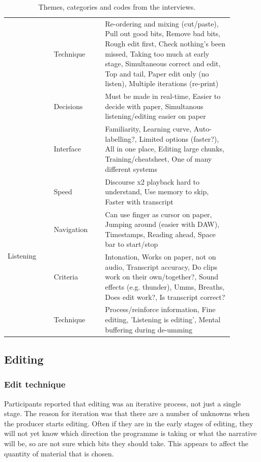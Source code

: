 \begin{table}[h]
{\begin{tabular}{|p{0.18\linewidth}|p{0.2\linewidth}|p{0.5\linewidth}|}
 & Technique & Re-ordering and mixing (cut/paste), Pull out good bits, Remove bad bits, Rough edit first, Check nothing's been missed, Taking too much at early stage, Simultaneous correct and edit, Top and tail, Paper edit only (no listen), Multiple iterations (re-print) \\ \cline{2-3}
 & Decisions & Must be made in real-time, Easier to decide with paper, Simultanous listening/editing easier on paper \\ \cline{2-3}
 & Interface & Familiarity, Learning curve, Auto-labelling?, Limited options (faster?), All in one place, Editing large chunks, Training/cheatsheet, One of many different systems \\ \hline
\multirow{4}{*}{Listening}
 & Speed & Discourse x2 playback hard to understand, Use memory to skip, Faster with transcript \\ \cline{2-3}
 & Navigation & Can use finger as cursor on paper, Jumping around (easier with DAW), Timestamps, Reading ahead, Space bar to start/stop \\ \cline{2-3}
 & Criteria & Intonation, Works on paper, not on audio, Transcript accuracy, Do clips work on their own/together?, Sound effects (e.g. thunder), Umms, Breaths, Does edit work?, Is transcript correct? \\ \cline{2-3}
 & Technique & Process/reinforce information, Fine editing, 'Listening is editing', Mental buffering during de-umming \\ \hline

\end{tabular}
}
\caption{Themes, categories and codes from the interviews.}
\label{tab:paper-codes}
\end{table}

\subsection{Editing}

\subsubsection{Edit technique}


Participants reported that editing was an iterative process, not just a single stage.
The reason for iteration was that there are a number of unknowns when the producer starts editing.
Often if they are in the early stages of editing, they will not yet know which direction the programme is taking or
what the narrative will be, so are not sure which bits they should take.  This appears to affect the quantity of
material that is chosen.

